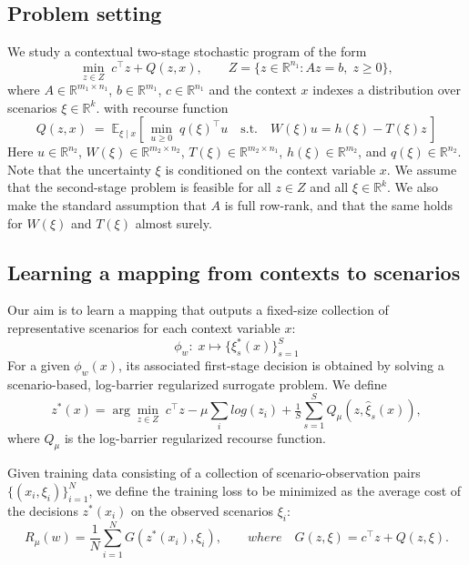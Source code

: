 \documentclass{article}
\begin{document}
\subsection{Problem setting}
We study a contextual two-stage stochastic program of the form
\begin{equation}
\min_{z \in Z}\; c^\top z + Q(z,x), 
\qquad   
Z = \{z \in \mathbb{R}^{n_1} : Az=b,\; z \geq 0\},
\end{equation}
where $A \in \mathbb{R}^{m_1\times n_1}$, $b \in \mathbb{R}^{m_1}$, $c \in \mathbb{R}^{n_1}$ and the context $x$ indexes a distribution over scenarios $\xi \in \mathbb{R}^k$.
with recourse function
\begin{equation}
Q(z,x) \;=\; \mathbb{E}_{\xi\mid x}\!\left[\,\min_{u\ge 0} \; q(\xi)^\top u \quad \text{s.t.}\quad W(\xi)u = h(\xi) - T(\xi)z \,\right]
\end{equation}
Here $u \in \mathbb{R}^{n_2}$, $W(\xi) \in \mathbb{R}^{m_2\times n_2}$, $T(\xi) \in \mathbb{R}^{m_2\times n_1}$, $h(\xi) \in \mathbb{R}^{m_2}$, and $q(\xi) \in \mathbb{R}^{n_2}$. 
Note that the uncertainty $\xi$ is conditioned on the context variable $x$.
We assume that the second-stage problem is feasible for all $z \in Z$ and all $\xi \in \mathbb{R}^k$.
We also make the standard assumption that $A$ is full row-rank, and that the same holds for $W(\xi)$ and $T(\xi)$ almost surely.

\subsection{Learning a mapping from contexts to scenarios}
Our aim is to learn a mapping that outputs a fixed-size collection of representative scenarios for each context variable $x$:
\begin{equation}
\phi_w: \; x \mapsto \{\xi^*_s(x)\}_{s=1}^S
\end{equation} 
For a given $\phi_w(x)$, its associated first-stage decision is obtained by solving a scenario-based, log-barrier regularized 
surrogate problem.
We define
\begin{equation}
 z^*(x) = \arg\min_{z \in Z} \; c^\top z - \mu \sum_i log(z_i) +  \tfrac{1}{S}\sum_{s=1}^S Q_\mu(z,\hat\xi_s(x)),
\end{equation}
where $Q_\mu$ is the log-barrier regularized recourse function. 

Given training data consisting of a collection of scenario-observation pairs $\{(x_i,\xi_i)\}_{i=1}^N$, we define the training loss to be minimized as the 
average cost of the decisions $ z^*(x_i)$ on the observed scenarios $\xi_i$:
\begin{equation}
R_\mu(w) = \frac{1}{N}\sum_{i=1}^N G(z^*(x_i), \xi_i), 
\qquad  where \quad 
G(z,\xi) = c^\top z + Q(z,\xi).
\end{equation}
\end{document}
